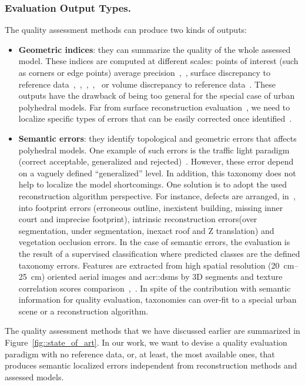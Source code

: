 \documentclass[runningheads]{llncs}
\begin{document}
\subsubsection{Evaluation Output Types.}
The quality assessment methods can produce two kinds of outputs:
\begin{itemize}
	\item \textbf{Geometric indices}: they can summarize the quality of the whole assessed model. These indices are computed at different scales: points of interest (such as corners or edge points) average precision~\cite{Kaartinen2005},~\cite{Voegtle2003}, surface discrepancy to reference data~\cite{Kaartinen2005},~\cite{Henricsson1997},~\cite{Zeng2014},~\cite{Lafarge2012},~\cite{li2016boxfitting} or volume discrepancy to reference data~\cite{Zeng2014}. These outputs have the drawback of being too general for the special case of urban polyhedral models. Far from surface reconstruction evaluation~\cite{berger2013benchmark}, we need to localize specific types of errors that can be easily corrected once identified~\cite{OudeElberink2010}.
	\item \textbf{Semantic errors}: they identify topological and geometric errors that affects polyhedral models. One example of such errors is the traffic light paradigm (correct acceptable, generalized and rejected)~\cite{boudet2006supervised}. However, these error depend on a vaguely defined ``generalized'' level. In addition, this taxonomy does not help to localize the model shortcomings. One solution is to adopt the used reconstruction algorithm perspective. For instance, defects are arranged, in~\cite{Michelin2013}, into footprint errors (erroneous outline, inexistent building, missing inner court and imprecise footprint), intrinsic reconstruction errors(over segmentation, under segmentation, inexact roof and Z translation) and vegetation occlusion errors. In the case of semantic errors, the evaluation is the result of a supervised classification where predicted classes are the defined taxonomy errors. Features are extracted from high spatial resolution (\SIrange{20}{25}{\cm}) oriented aerial images and \glspl{acr::dsm} by 3D segments and texture correlation scores comparison~\cite{boudet2006supervised},~\cite{Michelin2013}. In spite of the contribution with semantic information for quality evaluation, taxonomies can over-fit to a special urban scene or a reconstruction algorithm.
\end{itemize}

The quality assessment methods that we have discussed earlier are summarized in Figure~\ref{fig::state_of_art}. In our work, we want to devise a quality evaluation paradigm with no reference data, or, at least, the most available ones, that produces semantic localized errors independent from reconstruction methods and assessed models.
\end{document}
